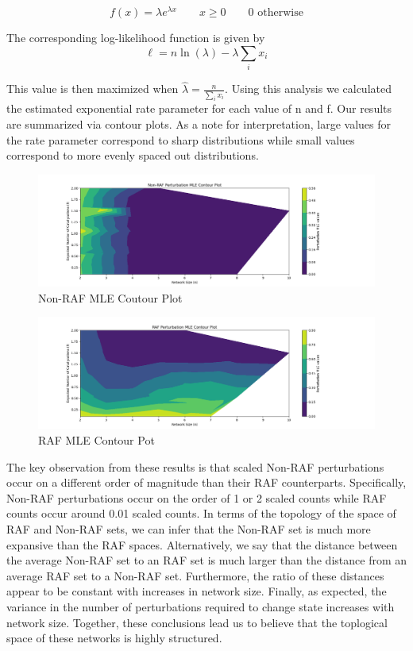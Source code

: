 \documentclass[11pt]{article}
\begin{document}
$$
f(x) = \lambda e^{\lambda x} \qquad x \geq 0 \qquad  0 \text{ otherwise}
$$

The corresponding log-likelihood function is given by 
$$\ell = n \ln(\lambda) - \lambda \sum_i x_i$$

This value is then maximized when $\hat{\lambda} = \frac{n}{\sum_i x_i}$.
Using this analysis we calculated the estimated exponential rate parameter for each value of n and f.
Our results are summarized via contour plots. As a note for interpretation, large values for the rate parameter correspond to sharp distributions while small values correspond to more evenly spaced out distributions.

\begin{figure}[H]
    \centering
    \includegraphics[width=15cm]{MLE_Contour_Non-RAF_Perturbation.png}
    \caption{Non-RAF MLE Coutour Plot}
\end{figure}
\begin{figure}[H]
    \centering
    \includegraphics[width=15cm]{MLE_Contour_RAF_Perturbation.png}
    \caption{RAF MLE Contour Pot}
\end{figure}

The key observation from these results is that scaled Non-RAF perturbations occur on a different order of magnitude than their RAF counterparts. 
Specifically, Non-RAF perturbations occur on the order of 1 or 2 scaled counts while RAF counts occur around 0.01 scaled counts.
In terms of the topology of the space of RAF and Non-RAF sets, we can infer that the Non-RAF set is much more expansive than the RAF spaces. 
Alternatively, we say that the distance between the average Non-RAF set to an RAF set is much larger than the distance from an average RAF set to a Non-RAF set.
Furthermore, the ratio of these distances appear to be constant with increases in network size.
Finally, as expected, the variance in the number of perturbations required to change state increases with network size.
Together, these conclusions lead us to believe that the toplogical space of these networks is highly structured. 
\end{document}
